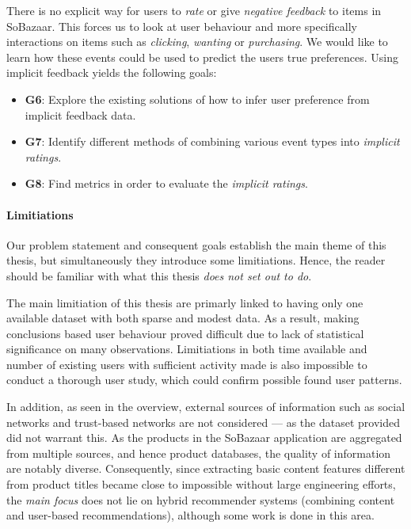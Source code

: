 There is no explicit way for users to \textit{rate} or give \textit{negative
feedback} to items in SoBazaar. This forces us to look at user behaviour and
more specifically interactions on items such as \textit{clicking},
\textit{wanting} or \textit{purchasing}. We would like to learn how these
events could be used to predict the users true preferences. Using implicit
feedback yields the following goals:

\begin{itemize}
  \item \textbf{G6}: Explore the existing solutions of how to infer user preference from
  implicit feedback data.
  \item \textbf{G7}: Identify different methods of combining various event types into
  \emph{implicit ratings}.
  \item \textbf{G8}: Find metrics in order to evaluate the \emph{implicit ratings}.
\end{itemize}

\paragraph{Limitiations} Our problem statement and consequent goals establish
the main theme of this thesis, but simultaneously they introduce some
limitiations. Hence, the reader should be familiar with what this thesis
\textit{does not set out to do}.

The main limitiation of this thesis are primarly linked to having only one
available dataset with both sparse and modest data. As a result, making
conclusions based user behaviour proved difficult due to lack of statistical
significance on many observations. Limitiations in both time available and
number of existing users with sufficient activity made is also impossible to
conduct a thorough user study, which could confirm possible found user
patterns.

In addition, as seen in the overview, external sources of information such as
social networks and trust-based networks are not considered --- as the dataset
provided did not warrant this. As the products in the SoBazaar application are
aggregated from multiple sources, and hence product databases, the quality of
information are notably diverse. Consequently, since extracting basic content
features different from product titles became close to impossible without large
engineering efforts, the \textit{main focus} does not lie on hybrid recommender
systems (combining content and user-based recommendations), although some work
is done in this area.

